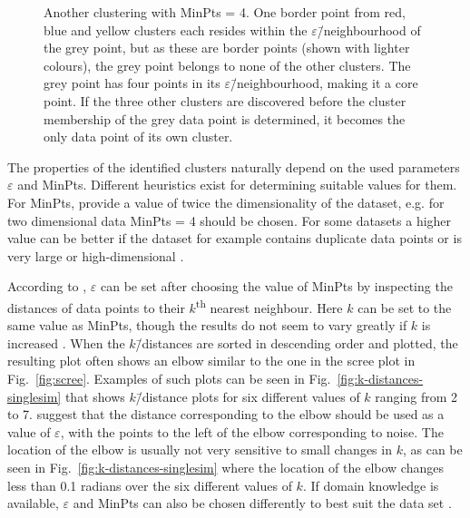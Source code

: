 \documentclass[english, oneside]{HYgradu}
\begin{document}
\begin{figure}
    \centering
    
    \caption{Another clustering with MinPts = 4. One border point from red, blue and yellow clusters each resides within the $\varepsilon$\=/neighbourhood of the grey point, but as these are border points (shown with lighter colours), the grey point belongs to none of the other clusters. The grey point has four points in its $\varepsilon$\=/neighbourhood, making it a core point. If the three other clusters are discovered before the cluster membership of the grey data point is determined, it becomes the only data point of its own cluster.}\label{fig:DBSCAN-singlecore}
\end{figure}

The properties of the identified clusters naturally depend on the used parameters $\varepsilon$ and MinPts. Different heuristics exist for determining suitable values for them. For MinPts, \citet{schubert2017dbscan} provide a value of twice the dimensionality of the dataset, e.g. for two dimensional data MinPts = 4 should be chosen. For some datasets a higher value can be better if the dataset for example contains duplicate data points or is very large or high-dimensional \citep{schubert2017dbscan}.

According to \citet{ester1996density}, $\varepsilon$ can be set after choosing the value of MinPts by inspecting the distances of data points to their $k$\textsuperscript{th} nearest neighbour. Here $k$ can be set to the same value as MinPts, though the results do not seem to vary greatly if $k$ is increased \citep{ester1996density}. When the $k$\=/distances are sorted in descending order and plotted, the resulting plot often shows an elbow similar to the one in the scree plot in Fig.\ \ref{fig:scree}. Examples of such plots can be seen in Fig.\ \ref{fig:k-distances-singlesim} that shows $k$\=/distance plots for six different values of $k$ ranging from 2 to 7. \citet{ester1996density} suggest that the distance corresponding to the elbow should be used as a value of $\varepsilon$, with the points to the left of the elbow corresponding to noise. The location of the elbow is usually not very sensitive to small changes in $k$, as can be seen in Fig.\ \ref{fig:k-distances-singlesim} where the location of the elbow changes less than 0.1 radians over the six different values of $k$. If domain knowledge is available, $\varepsilon$ and MinPts can also be chosen differently to best suit the data set \citep{schubert2017dbscan}.
\end{document}
